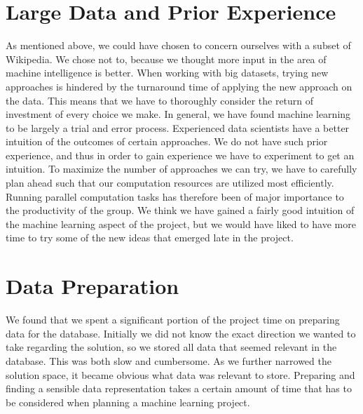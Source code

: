 \section{Large Data and Prior Experience}
As mentioned above, we could have chosen to concern ourselves with a subset of Wikipedia. We chose not to, because we thought more input in the area of machine intelligence is better. When working with big datasets, trying new approaches is hindered by the turnaround time of applying the new approach on the data. This means that we have to thoroughly consider the return of investment of every choice we make. In general, we have found machine learning to be largely a trial and error process. Experienced data scientists have a better intuition of the outcomes of certain approaches. We do not have such prior experience, and thus in order to gain experience we have to experiment to get an intuition. To maximize the number of approaches we can try, we have to carefully plan ahead such that our computation resources are utilized most efficiently. Running parallel computation tasks has therefore been of major importance to the productivity of the group. We think we have gained a fairly good intuition of the machine learning aspect of the project, but we would have liked to have more time to try some of the new ideas that emerged late in the project.  

\section{Data Preparation}
We found that we spent a significant portion of the project time on preparing data for the database. Initially we did not know the exact direction we wanted to take regarding the solution, so we stored all data that seemed relevant in the database. This was both slow and cumbersome. As we further narrowed the solution space, it became obvious what data was relevant to store. Preparing and finding a sensible data representation takes a certain amount of time that has to be considered when planning a machine learning project.

